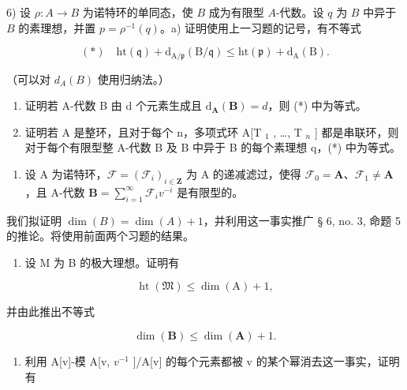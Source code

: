   6) 设 \(\rho: A \to B\) 为诺特环的单同态，使 \(B\) 成为有限型 \(A\)-代数。设 \(q\) 为 \(B\) 中异于 \(B\) 的素理想，并置 \(p = \rho^{-1}(q)\)。a) 证明使用上一习题的记号，有不等式

\[
(*) \quad \mathrm{ht} (\mathfrak {q}) + \mathrm{d} _ {\mathrm{A} / \mathfrak {p}} (\mathrm{B} / \mathfrak {q}) \leqslant \mathrm{ht} (\mathfrak {p}) + \mathrm{d} _ {\mathrm{A}} (\mathrm{B}).
\]

（可以对 \(d_{A}(B)\) 使用归纳法。）

\begin{enumerate}
\def\labelenumi{\alph{enumi})}
\setcounter{enumi}{1}
\item
  证明若 A-代数 B 由 d 个元素生成且 \(\mathrm{d}_{\mathbf{A}}(\mathbf{B}) = d\)，则 (*) 中为等式。
\item
   证明若 A 是整环，且对于每个 n，多项式环 A{[}T \(_{1}\) , \ldots, T \(_{n}\) {]} 都是串联环，则对于每个有限型整 A-代数 B 及 B 中异于 B 的每个素理想 q，(*) 中为等式。
\end{enumerate}

\begin{enumerate}
\def\labelenumi{\arabic{enumi})}
\setcounter{enumi}{6}
\tightlist
\item
  设 A 为诺特环，\(\mathcal{F} = (\mathcal{F}_i)_{i\in \mathbf{Z}}\) 为 A 的递减滤过，使得 \(\mathcal{F}_0 = \mathbf{A}\)、\(\mathcal{F}_1 \neq \mathbf{A}\)，且 A-代数 \(\mathbf{B} = \sum_{i=1}^{\infty} \mathcal{F}_i v^{-i}\) 是有限型的。
\end{enumerate}

我们拟证明 \(\dim(B) = \dim(A) + 1\)，并利用这一事实推广 § 6, no. 3, 命题 5 的推论。将使用前面两个习题的结果。

\begin{enumerate}
\def\labelenumi{\alph{enumi})}
\tightlist
\item
  设 M 为 B 的极大理想。证明有
\end{enumerate}

\[
\operatorname{ht} (\mathfrak {M}) \leqslant \dim (\mathrm{A}) + 1,
\]

并由此推出不等式

\[
\dim (\mathbf {B}) \leqslant \dim (\mathbf {A}) + 1.
\]

\begin{enumerate}
\def\labelenumi{\alph{enumi})}
\setcounter{enumi}{1}
\tightlist
\item
  利用 A{[}v{]}-模 A{[}v, \(v^{-1}\) {]}/A{[}v{]} 的每个元素都被 v 的某个幂消去这一事实，证明有
\end{enumerate}

